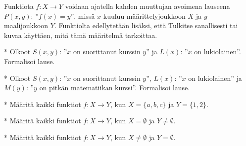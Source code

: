 \begin{kotitehtavasivu}
\begin{tehtava}
	Funktiota $f\colon X\to Y$ voidaan ajatella kahden
	muuttujan avoimena lauseena $P(x, y)$: ''$f(x) = y$'', missä
	$x$ kuuluu määrittelyjoukkoon $X$ ja $y$ maalijoukkoon $Y$.
	Funktiolta edellytetään lisäksi, että
	Tulkitse sanallisesti tai kuvaa käyttäen, mitä tämä määritelmä
	tarkoittaa.%
	\begin{vastaus}
	\end{vastaus}
\end{tehtava}

\begin{tehtava}
	* Olkoot $S(x, y)$: ''$x$ on suorittanut
	kurssin $y$'' ja $L(x)$: ''$x$ on lukiolainen''. Formalisoi lause.
\end{tehtava}

\begin{tehtava}
	* Olkoot $S(x, y)$: ''$x$ on suorittanut
	kurssin $y$'', $L(x)$: ''$x$ on lukiolainen'' ja $M(y)$: ''$y$ on
	pitkän matematiikan kurssi''. Formalisoi lause.
\end{tehtava}

\begin{tehtava}
	* Määritä kaikki funktiot $f\colon X\to Y$,
	kun $X=\{a, b, c\}$ ja $Y=\{1, 2\}$.%
\end{tehtava}

\begin{tehtava}
	* Määritä kaikki funktiot $f\colon X\to Y$,
	kun $X=\emptyset$ ja $Y\neq \emptyset$.%
\end{tehtava}

\begin{tehtava}
	* Määritä kaikki funktiot $f\colon X\to Y$,
	kun $X\neq \emptyset$ ja $Y= \emptyset$.%
\end{tehtava}

\end{kotitehtavasivu}


%	
